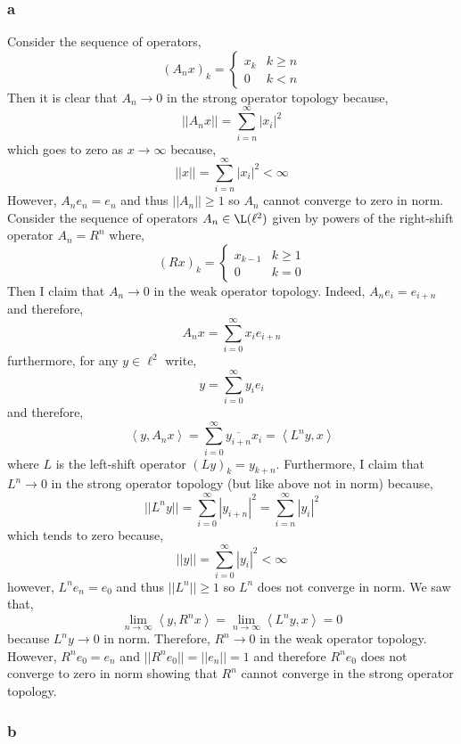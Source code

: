 \documentclass[12pt]{article}
\newcommand{\inner}[2]{\left< #1, #2 \right>}
\begin{document}
\subsubsection{a}

Consider the sequence of operators,
\[ (A_n x)_k = 
\begin{cases}
x_k & k \ge n
\\
0 & k < n
\end{cases} \]
Then it is clear that $A_n \to 0$ in the strong operator topology because,
\[ || A_n x || = \sum_{i = n}^\infty | x_i |^2 \]
which goes to zero as $x \to \infty$ because,
\[ || x || = \sum_{i = n}^\infty | x_i |^2 < \infty \]
However, $A_n e_n = e_n$ and thus $|| A_n || \ge 1$ so $A_n$ cannot converge to zero in norm.
\bigskip\\
Consider the sequence of operators $A_n \in \L(\ell^2)$ given by powers of the right-shift operator $A_n = R^n$ where,
\[ (R x)_k = 
\begin{cases}
x_{k-1} & k \ge 1
\\
0 & k = 0
\end{cases} \]
Then I claim that $A_n \to 0$ in the weak operator topology. Indeed, $A_n e_i = e_{i + n}$ and therefore,
\[ A_n x = \sum_{i = 0}^\infty x_i e_{i + n} \]
furthermore, for any $y \in \ell^2$ write,
\[ y = \sum_{i = 0}^\infty y_i e_i \]
and therefore,
\[ \inner{y}{A_n x} = \sum_{i = 0}^\infty \overline{y_{i + n}} x_i = \inner{L^n y}{x} \]
where $L$ is the left-shift operator $(L y)_k = y_{k + n}$. Furthermore, I claim that $L^n \to 0$ in the strong operator topology (but like above not in norm) because,
\[ || L^n y || = \sum_{i = 0}^\infty | y_{i + n} |^2 = \sum_{i = n}^\infty | y_i |^2 \]
which tends to zero because,
\[ || y || = \sum_{i = 0}^\infty | y_i |^2 < \infty \] 
however, $L^n e_n = e_0$ and thus $|| L^n || \ge 1$ so $L^n$ does not converge in norm. We saw that,
\[ \lim_{n \to \infty} \inner{y}{R^n x} = \lim_{n \to \infty} \inner{L^n y}{x} = 0 \]
because $L^n y \to 0$ in norm. Therefore, $R^n \to 0$ in the weak operator topology. However, $R^n e_0 = e_n$ and $|| R^n e_0 || = || e_n || = 1$ and therefore $R^n e_0$ does not converge to zero in norm showing that $R^n$ cannot converge in the strong operator topology.

\subsubsection{b}
\end{document}
